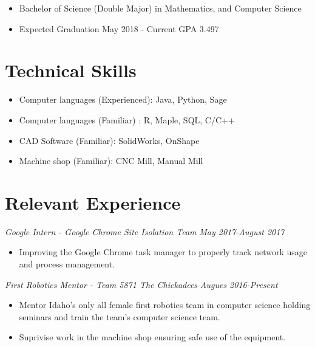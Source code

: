 \documentclass[letterpaper]{article}
\begin{document}
\begin{itemize}
\item Bachelor of Science (Double Major) in  Mathematics, and Computer Science


\item Expected Graduation May 2018 - Current GPA 3.497
\end{itemize}

\vspace{.06in}
\section*{Technical Skills}
\begin{itemize}
\item Computer languages (Experienced): Java, Python, Sage 
\item Computer languages (Familiar) : R, Maple, SQL, C/C++
\item CAD Software (Familiar): SolidWorks, OnShape
\item Machine shop (Familiar): CNC Mill, Manual Mill
\end{itemize}

\vspace{.06in}
\section*{Relevant Experience}

\begin{multicols}{2}
\textit{Google Intern - Google Chrome Site Isolation Team}
\vfill
\columnbreak
\textit{May 2017-August 2017}
\end{multicols}
\begin{itemize}
    \item Improving the Google Chrome task manager to properly track network usage and process management.
\end{itemize}

\vspace{.06in}

\begin{multicols}{2}
\textit{First Robotics Mentor - Team 5871 The Chickadees}
\vfill
\columnbreak
\textit{Augues 2016-Present}
\end{multicols}
\begin{itemize}
    \item Mentor Idaho's only all female first robotics team in computer science holding seminars
        and train the team's computer science team.
    \item Suprivise work in the machine shop ensuring safe use of the equipment. 
\end{itemize}
\end{document}
